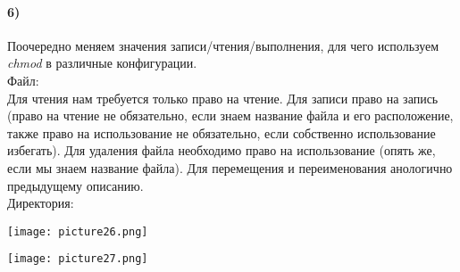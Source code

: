		\paragraph{6)}
		Поочередно меняем значения записи/чтения/выполнения, для чего используем 		\textit{chmod} в различные конфигурации. \\
		Файл: \\
		Для чтения нам требуется только право на чтение. Для записи право на запись (право на чтение не обязательно, если знаем название файла и его расположение, также право на использование не обязательно, если собственно использование избегать). Для удаления файла необходимо право на использование (опять же, если мы знаем название файла). Для перемещения и переименования анологично предыдущему описанию.\\
		Директория:\\
		
		\begin{center}
			\texttt{[image: picture26.png]}
		\end{center}
		\vspace{0.1cm}
		\begin{center}
			\texttt{[image: picture27.png]}
		\end{center}


	  
	  
	  
		
